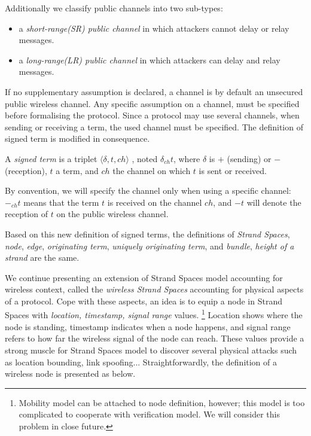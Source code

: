 Additionally we classify public channels into two sub-types: 
\begin{itemize}
  \item a \textit{short-range(SR) public channel} in which attackers cannot delay or relay messages. 
  \item a \textit{long-range(LR) public channel} in which attackers can delay and relay messages. 
\end{itemize}

If no supplementary assumption is declared, a channel is by default an unsecured public wireless channel. Any specific assumption on a channel, must be specified before formalising the protocol. Since a protocol may use several channels, when sending or receiving a term, the used channel must be specified. The definition of signed term is modified in consequence. 

\begin{Definition}
A \emph{signed term} is a triplet $\langle \delta, t, ch \rangle$ , noted $\delta_{ch} t$, where $\delta$ is $+$ (sending) or $-$ (reception), $t$ a term, and $ch$ the channel on which $t$ is sent or received.
\end{Definition}

By convention, we will specify the channel only when using a specific channel: $-_{ch}t$ means that the term $t$ is received on the channel $ch$, and $-t$ will denote the reception of $t$ on the public wireless channel.

Based on this new definition of signed terms, the definitions of \textit{Strand Spaces}, \textit{node}, \textit{edge}, \textit{originating term}, \textit{uniquely originating term}, and \textit{bundle}, \textit{height of a strand} are the same.

We continue presenting an extension of Strand Spaces model accounting for wireless context, called the \textit{wireless Strand Spaces} accounting for physical aspects of a protocol. Cope with these aspects, an idea is to equip a node in Strand Spaces with \textit{location, timestamp, signal range} values. \footnote{Mobility model can be attached to node definition, however; this model is too complicated to cooperate with verification model. We will consider this problem in close future.} Location shows where the node is standing, timestamp indicates when a node happens, and signal range refers to how far the wireless signal of the node can reach. These values provide a strong muscle for Strand Spaces model to discover several physical attacks such as location bounding, link spoofing... Straightforwardly, the definition of a wireless node is presented as below.

